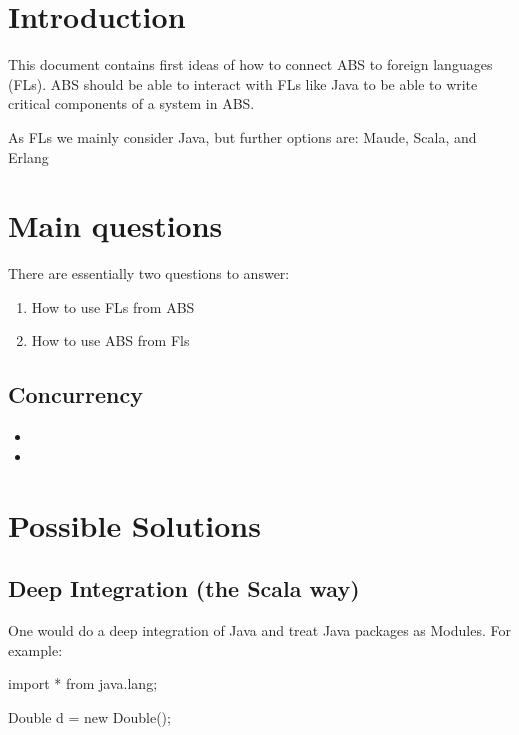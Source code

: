 \documentclass[a4paper,11pt,final]{article}
\title{\deliverableTitle}
\author{Jan Sch\"{a}fer \and Peter Y. H. Wong}
\begin{document}
\maketitle 

\section{Introduction}
This document contains first ideas of how to
connect ABS to foreign languages (FLs).
ABS should be able to interact with FLs like
Java to be able to write critical components of a system
in ABS. 

As FLs we mainly consider Java, but further
options are: Maude, Scala, and Erlang

\section{Main questions}
There are essentially two questions to answer:
\begin{enumerate}
  \item How to use FLs from ABS
  \item How to use ABS from Fls
\end{enumerate}


\subsection{Concurrency}
\begin{itemize}
  \item {}
  \item {}
\end{itemize}

\section{Possible Solutions}

\subsection{Deep Integration (the Scala way)}
One would do a deep integration of Java and treat Java packages as Modules.
For example:

\begin{absexamplen}
import * from java.lang;

{
  Double d = new Double();
}
\end{absexamplen}   
\end{document}
